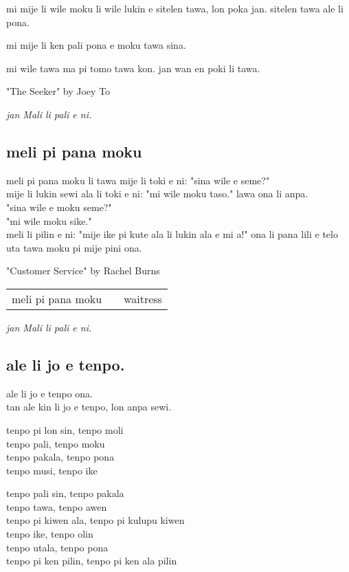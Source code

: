 mi mije li wile moku li wile lukin e sitelen tawa, lon poka jan.
sitelen tawa ale li pona.

mi mije li ken pali pona e moku tawa sina.

mi wile tawa ma pi tomo tawa kon.
jan wan en poki li tawa.

"The Seeker" by Joey To

\textit{jan Mali li pali e ni. \cite{www:astrodonunt:01}}

\subsection{meli pi pana moku}
meli pi pana moku li tawa mije li toki e ni: "sina wile e seme?" \\
mije li lukin sewi ala li toki e ni: "mi wile moku taso." lawa ona li anpa. \\
"sina wile e moku seme?" \\
"mi wile moku sike." \\
meli li pilin e ni: "mije ike pi kute ala li lukin ala e mi a!"
ona li pana lili e telo uta tawa moku pi mije pini ona.

"Customer Service" by Rachel Burns

\begin{supertabular}{p{5,5cm}|ll}
    meli pi pana moku &  & waitress \\
\end{supertabular}

\textit{jan Mali li pali e ni. \cite{www:astrodonunt:01}}

\subsection{ale li jo e tenpo.}
ale li jo e tenpo ona. \\
tan ale kin li jo e tenpo, lon anpa sewi.

tenpo pi lon sin, tenpo moli \\
tenpo pali, tenpo moku \\
tenpo pakala, tenpo pona \\
tenpo musi, tenpo ike

tenpo pali sin, tenpo pakala \\
tenpo tawa, tenpo awen \\
tenpo pi kiwen ala, tenpo pi kulupu kiwen \\

tenpo ike, tenpo olin \\
tenpo utala, tenpo pona \\
tenpo pi ken pilin, tenpo pi ken ala pilin \\

